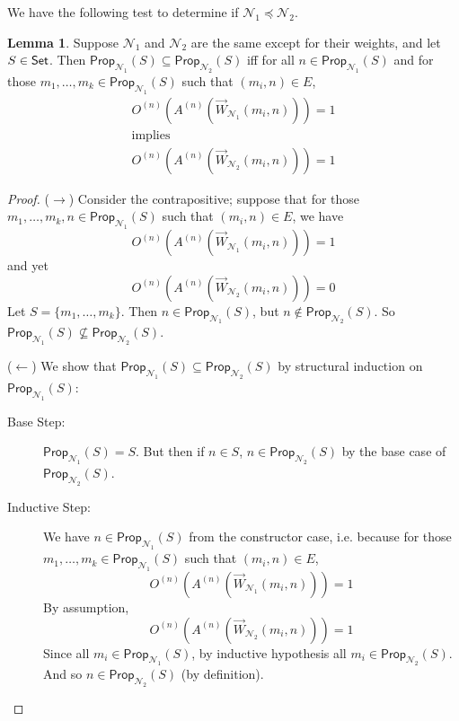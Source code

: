 \documentclass[letterpaper]{article}
\theoremstyle{definition}
\newtheorem{lemma}[theorem]{Lemma}
\newcommand{\Set}{\mbox{\sf Set}}
\newcommand{\set}[1]{\{ #1 \}}
\newcommand{\Prop}{\textsf{Prop}}
\newcommand{\Net}{\mathcal{N}}
\begin{document}
We have the following test to determine if $\Net_1 \preceq \Net_2$.
\begin{lemma}
\label{lemma:subnet->leq}
Suppose $\Net_1$ and $\Net_2$ are the same except for their weights, and let $S \in \Set$.  Then ${\Prop_{\Net_1}(S) \subseteq \Prop_{\Net_2}(S)}$ iff for all $n \in \Prop_{\Net_1}(S)$ and for those $m_1, \ldots, m_k \in \Prop_{\Net_1}(S)$ such that $(m_i, n) \in E$,
\begin{equation}\tag{$\ast\ast$}
\label{eqn:weight-condition}
  \begin{gathered}
    O^{(n)}(A^{(n)}(\overrightarrow{W}_{\Net_1}(m_i, n))) = 1 \\
    \mbox{implies} \\
    O^{(n)}(A^{(n)}(\overrightarrow{W}_{\Net_2}(m_i, n))) = 1
  \end{gathered}
\end{equation}
\end{lemma}
\begin{proof}
($\rightarrow$) Consider the contrapositive; suppose that for those $m_1, \ldots, m_k, n \in \Prop_{\Net_1}(S)$ such that $(m_i, n) \in E$, we have
\[
O^{(n)}(A^{(n)}(\overrightarrow{W}_{\Net_1}(m_i, n))) = 1
\]
and yet
\[
O^{(n)}(A^{(n)}(\overrightarrow{W}_{\Net_2}(m_i, n))) = 0
\]
Let $S = \set{m_1, \ldots, m_k}$.  Then $n \in \Prop_{\Net_1}(S)$, but $n \not \in \Prop_{\Net_2}(S)$.  So $\Prop_{\Net_1}(S) \not \subseteq \Prop_{\Net_2}(S)$.


($\leftarrow$) We show that $\Prop_{\Net_1}(S) \subseteq \Prop_{\Net_2}(S)$ by structural induction on $\Prop_{\Net_1}(S)$:

\begin{description}
\item[Base Step:] $\Prop_{\Net_1}(S) = S$.  But then if $n \in S$, $n \in \Prop_{\Net_2}(S)$ by the base case of $\Prop_{\Net_2}(S)$.

\item[Inductive Step:]
We have $n \in \Prop_{\Net_1}(S)$ from the constructor case, i.e. because for those $m_1, \ldots, m_k \in \Prop_{\Net_1}(S)$ such that $(m_i, n) \in E$,
\[
O^{(n)}(A^{(n)}(\overrightarrow{W}_{\Net_1}(m_i, n))) = 1
\]
By assumption,
\[
O^{(n)}(A^{(n)}(\overrightarrow{W}_{\Net_2}(m_i, n))) = 1
\]
Since all $m_i \in \Prop_{\Net_1}(S)$, by inductive hypothesis all $m_i \in \Prop_{\Net_2}(S)$.  And so $n \in \Prop_{\Net_2}(S)$ (by definition).
\end{description}
\end{proof}
\end{document}
